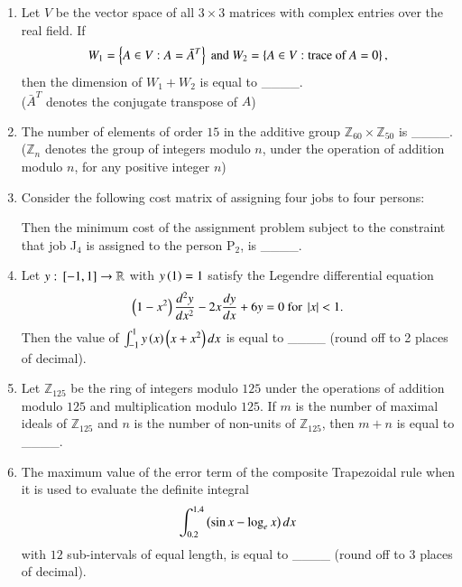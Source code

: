 \documentclass[journal]{IEEEtran}
\begin{document}
\begin{enumerate}
    \item Let $V$ be the vector space of all $3 \times 3$ matrices with complex entries over the real field. If
            \begin{align*}
                W_1 = \left\{A \in V : A = \bar{A}^T\right\} \text{ and } W_2 = \left\{A \in V : \text{trace of } A = 0\right\},
            \end{align*}
            then the dimension of $W_1 + W_2$ is equal to \_\_\_\_.\\
            ($\bar{A}^T$ denotes the conjugate transpose of $A$)

    \item The number of elements of order $15$ in the additive group $\mathbb{Z}_{60} \times \mathbb{Z}_{50}$ is \_\_\_\_. \\
            ($\mathbb{Z}_n$ denotes the group of integers modulo $n$, under the operation of addition modulo $n$, for any positive integer $n$)

    \item Consider the following cost matrix of assigning four jobs to four persons:
            \begin{table}[h!]
                \centering
                
                \caption{}
                \label{{48t}}
            \end{table}

        Then the minimum cost of the assignment problem subject to the constraint that job J$_4$ is assigned to the person P$_2$, is \_\_\_\_.
    
    \item Let $y : {}\left[-1,1\right] \rightarrow \mathbb{R}$ with $y\left(1\right) = 1 $ satisfy the Legendre differential equation
            \begin{align*}
                \left(1 - x^2\right) \frac{d^2 y}{d x ^2} - 2 x \frac{dy}{dx} + 6y = 0 \text{ for } \left\vert x\right\vert < 1.
            \end{align*}
        Then the value of $\int_{-1}^1 y \left(x\right) \left(x+x^2\right)dx$ is equal to \_\_\_\_ (round off to 2 places of decimal).
        
    \item Let $\mathbb{Z}_{125}$ be the ring of integers modulo $125$ under the operations of addition modulo $125$ and multiplication modulo $125$. If $m$ is the number of maximal ideals of $\mathbb{Z}_{125}$ and $n$ is the number of non-units of $\mathbb{Z}_{125}$, then $m+n$ is equal to \_\_\_\_.

    \item The maximum value of the error term of the composite Trapezoidal rule when it is used to evaluate the definite integral
            \begin{align*}
                \int_{0.2}^{1.4} \left(\sin x - \log_e x\right) dx
            \end{align*}
        with $12$ sub-intervals of equal length, is equal to \_\_\_\_ (round off to $3$ places of decimal).


\end{enumerate}
\end{document}
